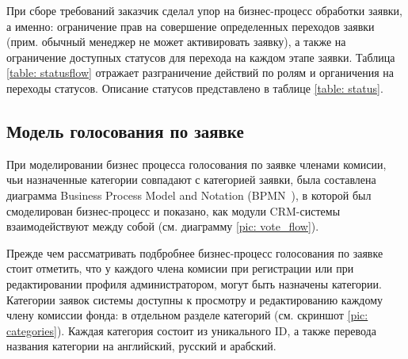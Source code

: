 \documentclass[a4paper,12pt,reqno]{article}
\begin{document}
При сборе требований заказчик сделал упор на бизнес-процесс обработки заявки, а именно: ограничение прав на совершение определенных переходов заявки (прим. обычный менеджер не может активировать заявку), а также на ограничение доступных статусов для перехода на каждом этапе заявки. Таблица \ref{table: statusflow} отражает разграничение действий по ролям и органичения на переходы статусов. Описание статусов представлено в таблице \ref{table: status}.







\subsection{Модель голосования по заявке} \label{sec: vote}

При моделировании бизнес процесса голосования по заявке членами комисии, чьи назначенные категории совпадают с категорией заявки, была составлена диаграмма Business Process Model and Notation (BPMN~\cite{bpmn}), в которой был смоделирован бизнес-процесс и показано, как модули CRM-системы взаимодействуют между собой (см. диаграмму \ref{pic: vote_flow}).

Прежде чем рассматривать подбробнее бизнес-процесс голосования по заявке стоит отметить, что у каждого члена комисии при регистрации или при редактировании профиля администратором, могут быть назначены категории. Категории заявок системы доступны к просмотру и редактированию каждому члену комиссии фонда: в отдельном разделе категорий (см. скриншот \ref{pic: categories}). Каждая категория состоит из уникального ID, а также перевода названия категории на английский, русский и арабский.  
\end{document}
